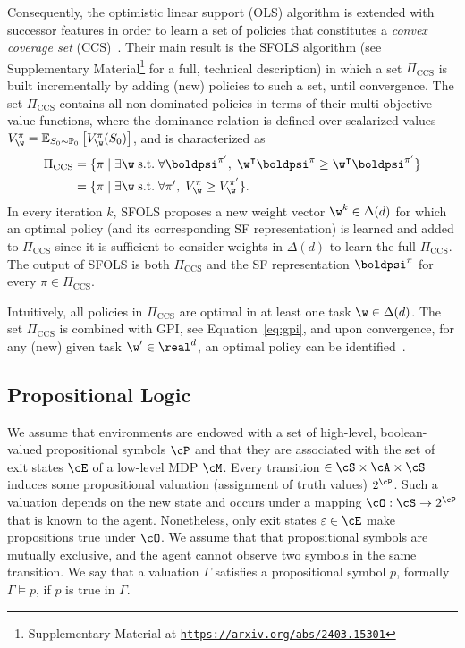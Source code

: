  Consequently, the optimistic linear support (OLS) algorithm is extended with successor features in order to learn a set of policies that constitutes a \textit{convex coverage set} (CCS)~\cite{Roijers2015}. Their main result is the SFOLS algorithm (see Supplementary Material\footnote{Supplementary Material at {\texttt{\url{https://arxiv.org/abs/2403.15301}}}} for a full, technical description) in which a set $\Pi_\text{CCS}$ is built incrementally by adding (new) policies to such a set, until convergence. The set $\Pi_\text{CCS}$ contains all non-dominated policies in terms of their multi-objective value functions, where the dominance relation is defined over scalarized values ${V^\pi_\w = \mathbb{E}_{S_0\sim\mathbb{P}_0}\left[V^\pi_\w(S_0)\right]}$, and is characterized as
\begin{align}
  \Pi_\text{CCS} &= \{\pi\;\lvert\;\exists\w\;\text{s.t.}\;\forall {\boldpsi}^{\pi'},\; \w^\intercal {\boldpsi}^\pi {\;\geq\;} \w^\intercal{\boldpsi}^{\pi'} \} \nonumber\\
  &= \{ \pi \;\lvert\;\exists\w\;\text{s.t.}\;\forall {\pi'},\; {V^\pi_\w}{\;\geq\;} {V^{\pi'}_\w}\}.
\end{align} 
In every iteration $k$, SFOLS proposes a new weight vector $\w^k\in\Delta(d)$ for which an optimal policy (and its corresponding SF representation) is learned and added to $\Pi_\text{CCS}$ since it is sufficient to consider weights in $\Delta(d)$ to learn the full $\Pi_\text{CCS}$. The output of SFOLS is both $\Pi_\text{CCS}$ and the SF representation $\boldpsi^\pi$ for every $\pi\in\Pi_\text{CCS}$.
 
Intuitively, all policies in $\Pi_\text{CCS}$ are optimal in at least one task $\w \in \Delta(d)$.
The set $\Pi_\text{CCS}$ is combined with GPI, see Equation~\eqref{eq:gpi}, and upon convergence, for any (new) given task $\w'\in\real^d$, an optimal policy can be identified~\cite[cf. Theorem 2]{Alegre2022}.


\subsection{Propositional Logic}
We assume that environments are endowed with a set of high-level, boolean-valued propositional symbols $\cP$ and that they are associated with the set of exit states $\cE$ of a low-level MDP $\cM$. Every transition $\in\cS\times\cA\times\cS$ induces some propositional valuation (assignment of truth values) $2^\cP$. Such a valuation depends on the new state and occurs under a mapping ${\cO:\cS\rightarrow2^\cP}$ that is known to the agent. Nonetheless, only exit states $\varepsilon\in\cE$ make propositions true under $\cO$. We assume that that propositional symbols are mutually exclusive, and the agent cannot observe two symbols in the same transition. We say that a valuation $\Gamma$ satisfies a propositional symbol $p$, formally $\Gamma\vDash p$, if $p$ is true in $\Gamma$. 

